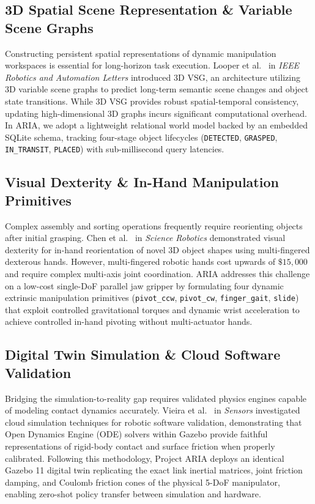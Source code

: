 \documentclass[journal]{IEEEtran}
\begin{document}
\subsection{3D Spatial Scene Representation \& Variable Scene Graphs}
Constructing persistent spatial representations of dynamic manipulation workspaces is essential for long-horizon task execution. Looper et al.~\cite{aria_004_looper_2023_3d} in \textit{IEEE Robotics and Automation Letters} introduced 3D VSG, an architecture utilizing 3D variable scene graphs to predict long-term semantic scene changes and object state transitions. While 3D VSG provides robust spatial-temporal consistency, updating high-dimensional 3D graphs incurs significant computational overhead. In ARIA, we adopt a lightweight relational world model backed by an embedded SQLite schema, tracking four-stage object lifecycles (\texttt{DETECTED}, \texttt{GRASPED}, \texttt{IN\_TRANSIT}, \texttt{PLACED}) with sub-millisecond query latencies.

\subsection{Visual Dexterity \& In-Hand Manipulation Primitives}
Complex assembly and sorting operations frequently require reorienting objects after initial grasping. Chen et al.~\cite{aria_135_chen_2023_visual} in \textit{Science Robotics} demonstrated visual dexterity for in-hand reorientation of novel 3D object shapes using multi-fingered dexterous hands. However, multi-fingered robotic hands cost upwards of $\$15,000$ and require complex multi-axis joint coordination. ARIA addresses this challenge on a low-cost single-DoF parallel jaw gripper by formulating four dynamic extrinsic manipulation primitives (\texttt{pivot\_ccw}, \texttt{pivot\_cw}, \texttt{finger\_gait}, \texttt{slide}) that exploit controlled gravitational torques and dynamic wrist acceleration to achieve controlled in-hand pivoting without multi-actuator hands.

\subsection{Digital Twin Simulation \& Cloud Software Validation}
Bridging the simulation-to-reality gap requires validated physics engines capable of modeling contact dynamics accurately. Vieira et al.~\cite{aria_117_vieira_2025_application} in \textit{Sensors} investigated cloud simulation techniques for robotic software validation, demonstrating that Open Dynamics Engine (ODE) solvers within Gazebo provide faithful representations of rigid-body contact and surface friction when properly calibrated. Following this methodology, Project ARIA deploys an identical Gazebo 11 digital twin replicating the exact link inertial matrices, joint friction damping, and Coulomb friction cones of the physical 5-DoF manipulator, enabling zero-shot policy transfer between simulation and hardware.
\end{document}

